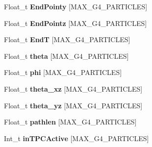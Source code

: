 \begin{DoxyCompactItemize}
\item 
\hypertarget{classanatree_a68f9e3bd4ef142a9b5f907e094b3dc23}{Float\-\_\-t {\bfseries End\-Pointy} \mbox{[}M\-A\-X\-\_\-\-G4\-\_\-\-P\-A\-R\-T\-I\-C\-L\-E\-S\mbox{]}}\label{classanatree_a68f9e3bd4ef142a9b5f907e094b3dc23}

\item 
\hypertarget{classanatree_aece0a93def779dff5ea7e1ae40422e4a}{Float\-\_\-t {\bfseries End\-Pointz} \mbox{[}M\-A\-X\-\_\-\-G4\-\_\-\-P\-A\-R\-T\-I\-C\-L\-E\-S\mbox{]}}\label{classanatree_aece0a93def779dff5ea7e1ae40422e4a}

\item 
\hypertarget{classanatree_a16fc332cdbbd1e054c7aee4d2b9561ff}{Float\-\_\-t {\bfseries End\-T} \mbox{[}M\-A\-X\-\_\-\-G4\-\_\-\-P\-A\-R\-T\-I\-C\-L\-E\-S\mbox{]}}\label{classanatree_a16fc332cdbbd1e054c7aee4d2b9561ff}

\item 
\hypertarget{classanatree_a0bcd0407cfdaed107584412c86ffda59}{Float\-\_\-t {\bfseries theta} \mbox{[}M\-A\-X\-\_\-\-G4\-\_\-\-P\-A\-R\-T\-I\-C\-L\-E\-S\mbox{]}}\label{classanatree_a0bcd0407cfdaed107584412c86ffda59}

\item 
\hypertarget{classanatree_a1d3be537590687fc34b9071711b472f2}{Float\-\_\-t {\bfseries phi} \mbox{[}M\-A\-X\-\_\-\-G4\-\_\-\-P\-A\-R\-T\-I\-C\-L\-E\-S\mbox{]}}\label{classanatree_a1d3be537590687fc34b9071711b472f2}

\item 
\hypertarget{classanatree_af77af6e17993e4b2939e91cf761b853d}{Float\-\_\-t {\bfseries theta\-\_\-xz} \mbox{[}M\-A\-X\-\_\-\-G4\-\_\-\-P\-A\-R\-T\-I\-C\-L\-E\-S\mbox{]}}\label{classanatree_af77af6e17993e4b2939e91cf761b853d}

\item 
\hypertarget{classanatree_a16256bc2b5ba915bf7f406987e914460}{Float\-\_\-t {\bfseries theta\-\_\-yz} \mbox{[}M\-A\-X\-\_\-\-G4\-\_\-\-P\-A\-R\-T\-I\-C\-L\-E\-S\mbox{]}}\label{classanatree_a16256bc2b5ba915bf7f406987e914460}

\item 
\hypertarget{classanatree_a3de3ddbc0b1344bbf21c461c03a68ba8}{Float\-\_\-t {\bfseries pathlen} \mbox{[}M\-A\-X\-\_\-\-G4\-\_\-\-P\-A\-R\-T\-I\-C\-L\-E\-S\mbox{]}}\label{classanatree_a3de3ddbc0b1344bbf21c461c03a68ba8}

\item 
\hypertarget{classanatree_ac37ca3f82d64c588fd9a26bdd4f3498f}{Int\-\_\-t {\bfseries in\-T\-P\-C\-Active} \mbox{[}M\-A\-X\-\_\-\-G4\-\_\-\-P\-A\-R\-T\-I\-C\-L\-E\-S\mbox{]}}\label{classanatree_ac37ca3f82d64c588fd9a26bdd4f3498f}


\end{DoxyCompactItemize}
